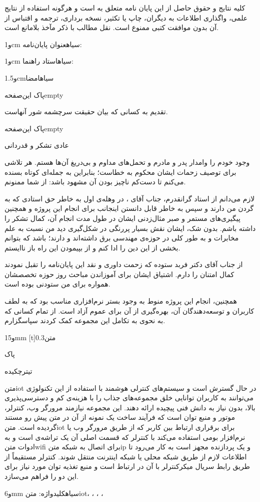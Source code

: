 کلیه نتایج و حقوق حاصل از این پايان نامه متعلق به \instfa است و هرگونه استفاده از نتایج علمی، واگذاری اطلاعات به دیگران، چاپ یا تکثیر، نسخه برداری، ترجمه و اقتباس از آن بدون موافقت کتبی \instfa ممنوع است. نقل مطالب با ذکر مآخذ بلامانع است.

‌و{1cm}
‌سیاه{عنوان پایان‌نامه}: \titlefa

‌و{1cm}
‌سیاه{استاد راهنما}:
\supervisorfa
{}


‌و{1.5cm}\authorfa{}‌سیاه{امضا}

‌پاک
‌این‌صفحه{empty}

 تقدیم به کسانی که بیان حقیقت سرچشمه شور آنهاست.

‌پاک
‌این‌صفحه{empty}

‌عادی تشکر و قدردانی


وجود خودم را وامدار پدر و مادرم و تحمل‌های مداوم و بی‌دریغ آن‌ها هستم. هر تلاشی برای توصیف زحمات ایشان محکوم به خطاست؛ بنابراین به جمله‌ای کوتاه بسنده می‌کنم تا دست‌کم ناچیز بودن آن مشهود باشد: از شما ممنونم.

لازم می‌دانم از استاد گرانقدرم، جناب آقای \supervisorfa، در وهله‌ی اول به خاطر حق استادی که به گردن من دارند و سپس به خاطر قابل دانستن اینجانب برای انجام این پروژه و همچنین پیگیری‌های مستمر و صبر مثال‌زدنی ایشان در طول مدت انجام آن، کمال تشکر را داشته باشم. بدون شک، ایشان نقش بسیار پررنگی در شکل‌گیری دید من نسبت به علم مخابرات و به طور کلی در حوزه‌ی مهندسی برق داشته‌اند و دارند؛ باشد که بتوانم بخشی از این دین را ادا کنم و از بپیمودن این راه باز ناایستم.

از جناب آقای دکتر فربد ستوده که زحمت داوری و نقد این پایان‌نامه را تقبل نمودند کمال امتنان را دارم. اشتیاق ایشان برای آموزاندن مباحث روز حوزه تخصصشان همواره برای من ستودنی بوده است.

همچنین، انجام این پروژه منوط به وجود بستر نرم‌افزاری مناسب بود که به لطف کاربران و توسعه‌دهندگان آن، بهره‌گیری از آن برای عموم آزاد است. از تمام کسانی که به نحوی به تکامل این مجموعه کمک کردند سپاسگزارم.

‌و{15mm}
[t]{0.3‌متن}
\authorfa\par\datefa
{}

‌پاک

‌تیتر{چکیده}

‌متن{iot} در حال گسترش است و سیستم‌های کنترلی هوشمند با استفاده از این تکنولوژی می‌توانند به کاربران توانایی خلق مجموعه‌های جذاب را با هزینه‌ی کم و دسترسی‌پذیری بالا، بدون نیاز به دانش فنی پیچیده ارائه دهند. این مجموعه‌ نیازمند مرورگر وب، کنترلر، موتور  و منبع توان است که فرآیند ساخت یک نمونه از آن در متن پیش رو مستند گردیده است. ‌متن{iot} برای برقراری ارتباط بین کاربر که از طریق مرورگر وب یا نرم‌افزار بومی استفاده می‌کند با کنترلر که قسمت اصلی آن یک تراشه‌ی  است و به ادوات ‌متن{wifi} برای اتصال به شبکه ‌متن{ip} و یک پردازنده مجهز است به کار می‌رود تا اطلاعات لازم از طریق شبکه محلی یا شبکه اینترنت منتقل شوند. کنترلر مستقیماً از طریق رابط سریال میکرکنترلر با آن در ارتباط است و منبع تغذیه توان مورد نیاز برای این دو را فراهم می‌سازد.

‌و{6mm}
‌سیاه{کلیدواژه}:
‌متن{iot}،
،
،
،

